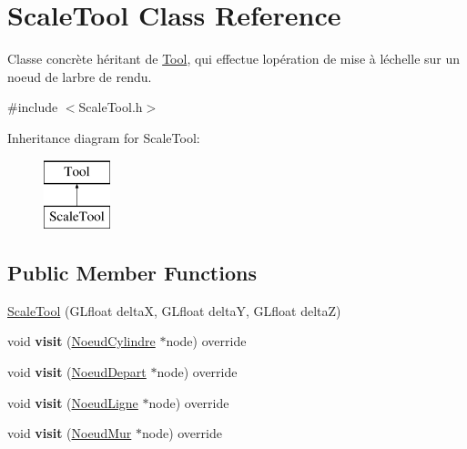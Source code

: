 \hypertarget{class_scale_tool}{}\section{Scale\+Tool Class Reference}
\label{class_scale_tool}


Classe concrète héritant de \hyperlink{class_tool}{Tool}, qui effectue l\textquotesingle{}opération de mise à l\textquotesingle{}échelle sur un noeud de l\textquotesingle{}arbre de rendu.  




{\ttfamily \#include $<$Scale\+Tool.\+h$>$}

Inheritance diagram for Scale\+Tool\+:\begin{figure}[H]
\begin{center}
\leavevmode
\includegraphics[height=2.000000cm]{class_scale_tool}
\end{center}
\end{figure}
\subsection*{Public Member Functions}
\begin{DoxyCompactItemize}
\item 
\hyperlink{group__inf2990_ga87222e8bea8ff2b71862e5993d1a3669}{Scale\+Tool} (G\+Lfloat delta\+X, G\+Lfloat delta\+Y, G\+Lfloat delta\+Z)
\item 
\hypertarget{group__inf2990_gab8949c8d5e040c10f62d385129a586f2}{}void {\bfseries visit} (\hyperlink{class_noeud_cylindre}{Noeud\+Cylindre} $\ast$node) override\label{group__inf2990_gab8949c8d5e040c10f62d385129a586f2}

\item 
\hypertarget{group__inf2990_ga15d28436292d75172260ec68ae29807c}{}void {\bfseries visit} (\hyperlink{class_noeud_depart}{Noeud\+Depart} $\ast$node) override\label{group__inf2990_ga15d28436292d75172260ec68ae29807c}

\item 
\hypertarget{group__inf2990_gae4653a11079d994f660974bff61c5c7b}{}void {\bfseries visit} (\hyperlink{class_noeud_ligne}{Noeud\+Ligne} $\ast$node) override\label{group__inf2990_gae4653a11079d994f660974bff61c5c7b}

\item 
\hypertarget{group__inf2990_ga376afcceadc7462902ff0e3bad3573e9}{}void {\bfseries visit} (\hyperlink{class_noeud_mur}{Noeud\+Mur} $\ast$node) override\label{group__inf2990_ga376afcceadc7462902ff0e3bad3573e9}

\end{DoxyCompactItemize}


